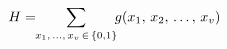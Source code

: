\documentclass[preview]{standalone}
\begin{document}
\begin{align*}
\special{dvisvgm:raw <g id='unique000'>}H = \!\!\sum_{x_1,\,\ldots,\,x_v\,\in\,\{0,1\}}\!\! g(x_1,\,x_2,\,\ldots,\,x_v)\special{dvisvgm:raw </g>}
\end{align*}
\end{document}
